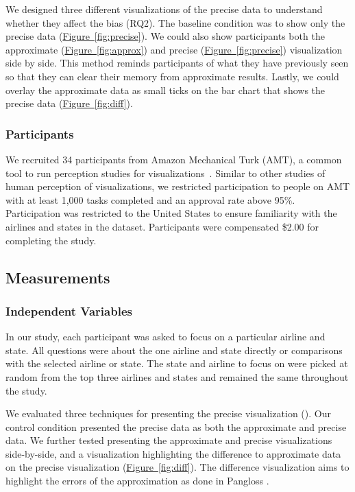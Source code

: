 \documentclass[10pt,journal,compsoc]{IEEEtran}
\newcommand{\figref}[1]{\hyperref[#1]{Figure~\ref*{#1}}}
\begin{document}
We designed three different visualizations of the precise data to understand whether they affect the bias (RQ2).
The baseline condition was to show only the precise data (\figref{fig:precise}).
We could also show participants both the approximate (\figref{fig:approx}) and precise (\figref{fig:precise}) visualization side by side.
This method reminds participants of what they have previously seen so that they can clear their memory from approximate results.
Lastly, we could overlay the approximate data as small ticks on the bar chart that shows the precise data (\figref{fig:diff}).

\subsubsection{Participants}

We recruited 34 participants from Amazon Mechanical Turk (AMT), a common tool to run perception studies for visualizations~\cite{heer2010crowdsourcing}.
Similar to other studies of human perception of visualizations, we restricted participation to people on AMT with at least 1,000 tasks completed and an approval rate above 95\%.
Participation was restricted to the United States to ensure familiarity with the airlines and states in the dataset.
Participants were compensated \$2.00 for completing the study.

\subsection{Measurements}
\subsubsection{Independent Variables}

In our study, each participant was asked to focus on a particular airline and state.
All questions were about the one airline and state directly or comparisons with the selected airline or state.
The state and airline to focus on were picked at random from the top three airlines and states and remained the same throughout the study.

We evaluated three techniques for presenting the precise visualization ().
Our control condition presented the precise data as both the approximate and precise data.
We further tested presenting the approximate and precise visualizations side-by-side, and a visualization highlighting the difference to approximate data on the precise visualization (\figref{fig:diff}).
The difference visualization aims to highlight the errors of the approximation as done in Pangloss \cite{moritz2017pangloss}.
\end{document}
